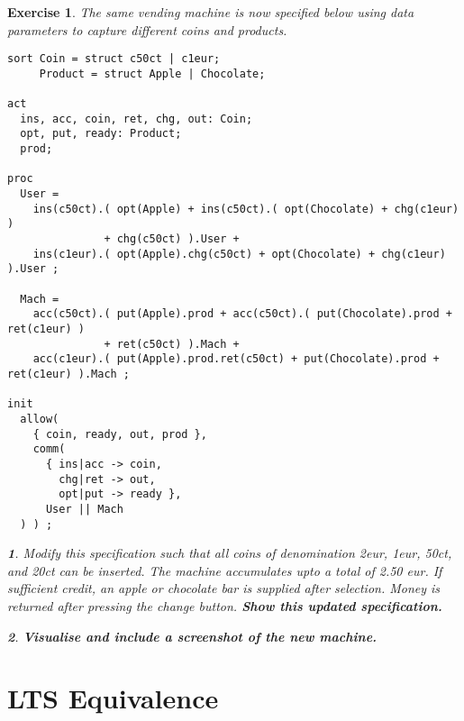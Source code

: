 \documentclass[11pt]{article}
\theoremstyle{myplain}
\newtheorem{exercise}{Exercise}
\theoremstyle{definition} %
\newtheorem{subexercise}{}[exercise]
\newcommand{\subex}[1]{\begin{subexercise}#1\end{subexercise}}
\begin{document}
\begin{exercise}
The same vending machine is now specified below using data parameters to capture different coins and products.

\begin{lstlisting}
sort Coin = struct c50ct | c1eur;
     Product = struct Apple | Chocolate;

act
  ins, acc, coin, ret, chg, out: Coin;
  opt, put, ready: Product;
  prod;

proc
  User = 
    ins(c50ct).( opt(Apple) + ins(c50ct).( opt(Chocolate) + chg(c1eur) )
               + chg(c50ct) ).User +
    ins(c1eur).( opt(Apple).chg(c50ct) + opt(Chocolate) + chg(c1eur) ).User ;

  Mach = 
    acc(c50ct).( put(Apple).prod + acc(c50ct).( put(Chocolate).prod + ret(c1eur) )
               + ret(c50ct) ).Mach +
    acc(c1eur).( put(Apple).prod.ret(c50ct) + put(Chocolate).prod + ret(c1eur) ).Mach ;

init
  allow(
    { coin, ready, out, prod },
    comm(
      { ins|acc -> coin,
        chg|ret -> out,
        opt|put -> ready },
      User || Mach
  ) ) ;  
\end{lstlisting}

\subex{Modify this specification such that all coins of denomination 2eur, 1eur, 50ct, and 20ct can be inserted. The machine accumulates upto a total of 2.50 eur. If sufficient credit, an apple or chocolate bar is supplied after selection. Money is returned after pressing the change button.
\textbf{Show this updated specification.}}

\subex{\bfseries Visualise and include a screenshot of the new machine.}

\end{exercise}

\section*{LTS Equivalence}
\end{document}
